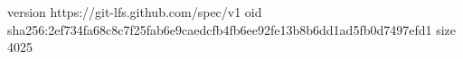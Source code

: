 version https://git-lfs.github.com/spec/v1
oid sha256:2ef734fa68c8c7f25fab6e9caedcfb4fb6ee92fe13b8b6dd1ad5fb0d7497efd1
size 4025
